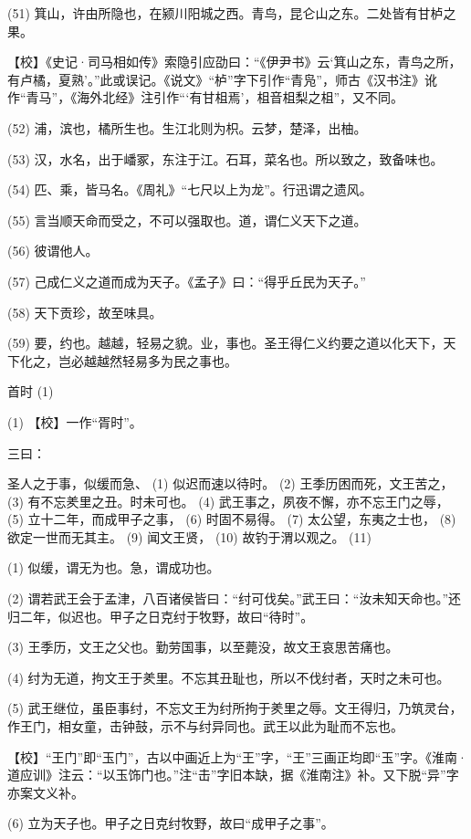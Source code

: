 \documentclass[12pt,UTF8]{ctexbook}
\begin{document}
(51) 箕山，许由所隐也，在颍川阳城之西。青鸟，昆仑山之东。二处皆有甘栌之果。

【校】《史记·司马相如传》索隐引应劭曰：“《伊尹书》云‘箕山之东，青鸟之所，有卢橘，夏熟’。”此或误记。《说文》“栌”字下引作“青凫”，师古《汉书注》讹作“青马”，《海外北经》注引作“‘有甘柤焉’，柤音柤梨之柤”，又不同。

(52) 浦，滨也，橘所生也。生江北则为枳。云梦，楚泽，出柚。

(53) 汉，水名，出于嶓冢，东注于江。石耳，菜名也。所以致之，致备味也。

(54) 匹、乘，皆马名。《周礼》“七尺以上为龙”。行迅谓之遗风。

(55) 言当顺天命而受之，不可以强取也。道，谓仁义天下之道。

(56) 彼谓他人。

(57) 己成仁义之道而成为天子。《孟子》曰：“得乎丘民为天子。”

(58) 天下贡珍，故至味具。

(59) 要，约也。越越，轻易之貌。业，事也。圣王得仁义约要之道以化天下，天下化之，岂必越越然轻易多为民之事也。





首时 (1)


(1) 【校】一作“胥时”。

三曰：

圣人之于事，似缓而急、 (1) 似迟而速以待时。 (2) 王季历困而死，文王苦之， (3) 有不忘羑里之丑。时未可也。 (4) 武王事之，夙夜不懈，亦不忘王门之辱， (5) 立十二年，而成甲子之事， (6) 时固不易得。 (7) 太公望，东夷之士也， (8) 欲定一世而无其主。 (9) 闻文王贤， (10) 故钓于渭以观之。 (11)

(1) 似缓，谓无为也。急，谓成功也。

(2) 谓若武王会于孟津，八百诸侯皆曰：“纣可伐矣。”武王曰：“汝未知天命也。”还归二年，似迟也。甲子之日克纣于牧野，故曰“待时”。

(3) 王季历，文王之父也。勤劳国事，以至薨没，故文王哀思苦痛也。

(4) 纣为无道，拘文王于羑里。不忘其丑耻也，所以不伐纣者，天时之未可也。

(5) 武王继位，虽臣事纣，不忘文王为纣所拘于羑里之辱。文王得归，乃筑灵台，作王门，相女童，击钟鼓，示不与纣异同也。武王以此为耻而不忘也。

【校】“王门”即“玉门”，古以中画近上为“王”字，“王”三画正均即“玉”字。《淮南·道应训》注云：“以玉饰门也。”注“击”字旧本缺，据《淮南注》补。又下脱“异”字亦案文义补。

(6) 立为天子也。甲子之日克纣牧野，故曰“成甲子之事”。
\end{document}
